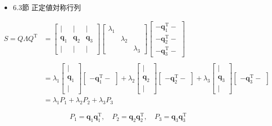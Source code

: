 \documentclass[letterpaper]{article}
\DeclareRobustCommand\transp{^{\mathrm{T}}}
\begin{document}
\begin{itemize}
  \item 6.3節 正定値対称行列
\end{itemize}

\begin{align*}
  S = Q \Lambda Q\transp
&= \begin{bmatrix}
    | & | & |\\
    \bm{q}_1 & \bm{q}_2 & \bm{q}_3\\
    | & | & |
  \end{bmatrix}
  \begin{bmatrix}
    \lambda_1 \\
           & \lambda_2 & \\
           & & \lambda_3
  \end{bmatrix}
  \begin{bmatrix}
  - \bm{q}_1\transp -\\
  - \bm{q}_2\transp -\\
  - \bm{q}_3\transp -
  \end{bmatrix}\\
  \\
  &=
  \lambda_1 \begin{bmatrix}
    |\\
    \bm{q}_1\\
    |
  \end{bmatrix}
  \begin{bmatrix}
    - \bm{q}_1\transp - 
  \end{bmatrix}
  +
  \lambda_2 \begin{bmatrix}
  |\\
  \bm{q}_2\\
  |
  \end{bmatrix}
  \begin{bmatrix}
  - \bm{q}_2\transp -
  \end{bmatrix} 
  +
  \lambda_3 \begin{bmatrix}
    |\\
    \bm{q}_3 \\
    |
  \end{bmatrix}
  \begin{bmatrix}
    - \bm{q}_3\transp -
  \end{bmatrix} \\
&= \lambda_1 P_1 + \lambda_2 P_2 + \lambda_3 P_3
\end{align*}

\begin{equation*}
  P_1=\bm{q}_1 \bm{q}_1\transp, \quad P_2=\bm{q}_2 \bm{q}_2\transp, \quad P_3=\bm{q}_3 \bm{q}_3\transp
\end{equation*}
\end{document}
